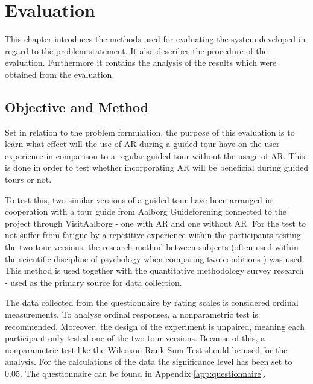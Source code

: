 \chapter{Evaluation}\label{ch:evaluation}
This chapter introduces the methods used for evaluating the system developed in regard to the problem statement. It also describes the procedure of the evaluation. Furthermore it contains the analysis of the results which were obtained from the evaluation.

\section{Objective and Method} 
Set in relation to the problem formulation, the purpose of this evaluation is to learn what effect will the use of AR during a guided tour have on the user experience in comparison to a regular guided tour without the usage of AR. This is done in order to test whether incorporating AR will be beneficial during guided tours or not. 

To test this, two similar versions of a guided tour have been arranged in cooperation with a tour guide from Aalborg Guideforening connected to the project through VisitAalborg - one with AR and one without AR. For the test to not suffer from fatigue by a repetitive experience within the participants testing the two tour versions, the research method between-subjects (often used within the scientific discipline of psychology when comparing two conditions \cite{Charness et al. 2011}) was used. This method is used together with the quantitative methodology survey research - used as the primary source for data collection.

The data collected from the questionnaire by rating scales is considered ordinal measurements. To analyse ordinal responses, a nonparametric test is recommended. Moreover, the design of the experiment is unpaired, meaning each participant only tested one of the two tour versions. Because of this, a nonparametric test like the Wilcoxon Rank Sum Test should be used for the analysis. For the calculations of the data the significance level has been set to 0.05. The questionnaire can be found in Appendix \ref{app:questionnaire}.

